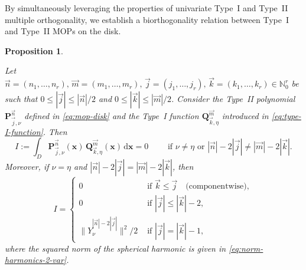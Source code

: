 \documentclass[a4paper]{article}
\theoremstyle{plain}
\newtheorem{proposition}[theorem]{Proposition}
\theoremstyle{definition}
\newcommand{\NN}{\mathbb{N}}
\newcommand{\dr}{\mathrm{d}}
\begin{document}
    By simultaneously leveraging  the properties of univariate Type~I and Type~II multiple orthogonality, we establish a biorthogonality relation between Type~I and Type~II MOPs on the disk.

    
    \begin{proposition} \label{prop:biorthogonality}
    
    Let $\vec n = (n_1,\dots,n_r),\,\vec m=(m_1,\dots,m_r), \, \vec j = (j_1,\dots,j_r),\,\vec k =(k_1,\dots,k_r)\in\NN_0^r$ be such that $0\leq |\vec j| \leq |\vec n|/2$ and $0\leq|\vec k|\leq|\vec m|/2$. Consider the Type~II polynomial $\mathbf{P}_{\vec j,\nu}^{\vec n}$ defined in \eqref{eq:mop-disk} and the Type~I function $\mathbf Q_{\vec k,\eta}^{\vec m}$ introduced in \eqref{eq:type-I-function}. Then 
    \begin{equation}
        I:=\int_D \mathbf{P}_{\vec j,\nu}^{\vec n}(\mathbf x)\, \mathbf Q_{\vec k,\eta}^{\vec m}(\mathbf x)\, \dr \mathbf x = 0\qquad \text{ if } \nu\neq \eta \text{ or } |\vec n|-2|\vec j|\neq |\vec m|-2|\vec k|.
    \end{equation}
    Moreover, if $\nu=\eta$ and $|\vec n|-2|\vec j| = |\vec m|-2|\vec k|$, then
    \begin{equation}
        I= \begin{cases}
            0 & \text{ if }  \vec k\leq \vec j \quad \text{(componentwise)},\\
            0 & \text{ if }  |\vec j|\leq |\vec k|-2, \\
            \|Y_{\nu}^{|\vec n|-2|\vec j|}\|^2/2 & \text{ if }  |\vec j| = |\vec k| -1,
        \end{cases}
    \end{equation}
    where the squared norm of the spherical harmonic is given in \eqref{eq:norm-harmonics-2-var}.
    \end{proposition}
\end{document}

